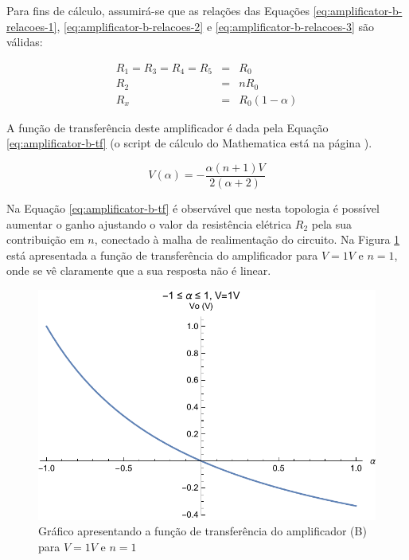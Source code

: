 \documentclass[a4paper]{instrumentacao}
\begin{document}
Para fins de cálculo, assumirá-se que as relações das Equações \ref{eq:amplificator-b-relacoes-1}, \ref{eq:amplificator-b-relacoes-2} e \ref{eq:amplificator-b-relacoes-3} são válidas:

\begin{eqnarray}
	R_1 = R_3 = R_4 = R_5 &=& R_0 \label{eq:amplificator-b-relacoes-1} \\
	R_2 &=& n R_0 \\ 		\label{eq:amplificator-b-relacoes-2} 
	R_x &=& R_0(1-\alpha) 	\label{eq:amplificator-b-relacoes-3} 
\end{eqnarray}

A função de transferência deste amplificador é dada pela Equação \ref{eq:amplificator-b-tf} (o script de cálculo do Mathematica está na página \pageref{att:amplificadores}).

\begin{equation}
	V(\alpha) = -\frac{\alpha  (n+1) V}{2 (\alpha +2)}
	\label{eq:amplificator-b-tf}
\end{equation}

Na Equação \ref{eq:amplificator-b-tf} é observável que nesta topologia é possível aumentar o ganho ajustando o valor da resistência elétrica $R_2$ pela sua contribuição em $n$, conectado à malha de realimentação do circuito. Na Figura \ref{fig:amplificador-b-tf} está apresentada a função de transferência do amplificador para $V=1V$ e $n=1$, onde se vê claramente que a sua resposta não é linear.

\begin{figure}[H]
\center
\includegraphics[width=\textwidth]{Amplificador-B-TF.pdf}
\caption{Gráfico apresentando a função de transferência do amplificador (B) para $V=1V$ e $n=1$}
\label{fig:amplificador-b-tf}
\end{figure}
\end{document}
